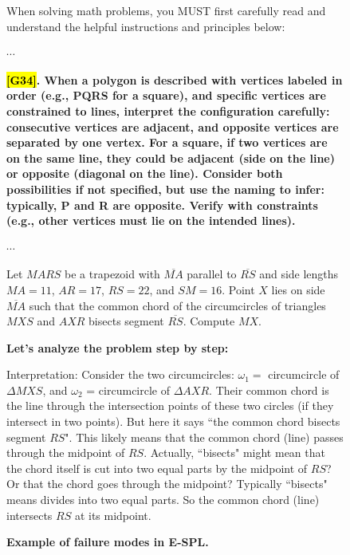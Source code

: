 \documentclass{article}
\theoremstyle{plain}
\theoremstyle{definition}
\theoremstyle{remark}
\begin{document}
\begin{figure}[!tb]
\centering
\caption{\textbf{Example of {\color{red}failure modes} in E-SPL.}}

\begin{runcard}[title={Example of How E-SPL Shapes Model Behavior}]

\medskip

\begin{runbox}[title={\textbf{Learned System Prompt}}]
When solving math problems, you MUST first carefully read and understand the helpful instructions and principles below:

$\cdots$

\textbf{\color{Brown}\hl{{[G34]}}. When a polygon is described with vertices labeled in order (e.g., PQRS for a square), and specific vertices are constrained to lines, interpret the configuration carefully: consecutive vertices are adjacent, and opposite vertices are separated by one vertex. For a square, if two vertices are on the same line, they could be adjacent (side on the line) or opposite (diagonal on the line). Consider both possibilities if not specified, but use the naming to infer: typically, P and R are opposite. Verify with constraints (e.g., other vertices must lie on the intended lines).}

$\cdots$

\end{runbox}

\begin{runbox}[title={Problem}]
Let $MARS$ be a trapezoid with $\overline{MA}$ parallel to $\overline{RS}$ and side lengths $MA = 11$, $AR = 17$, $RS = 22$, and $SM = 16$. Point $X$ lies on side $\overline{MA}$ such that the common chord of the circumcircles of triangles $MXS$ and $AXR$ bisects segment $\overline{RS}$. Compute $MX$.

\end{runbox}

\begin{runbox}[title={Model Output}]

\textbf{Let's analyze the problem step by step:}

\medskip

Interpretation: Consider the two circumcircles: $\omega_1 =$ circumcircle of $\Delta MXS$, and $\omega_2$ = circumcircle of $\Delta AXR$. Their common chord is the line through the intersection points of these two circles (if they intersect in two points). But here it says ``the common chord bisects segment $RS$". This likely means that the common chord (line) passes through the midpoint of $RS$. Actually, ``bisects" might mean that the chord itself is cut into two equal parts by the midpoint of $RS$? Or that the chord goes through the midpoint? Typically ``bisects" means divides into two equal parts. So the common chord (line) intersects $RS$ at its midpoint. 


\end{runbox}
\end{runcard}
\end{figure}
\end{document}
